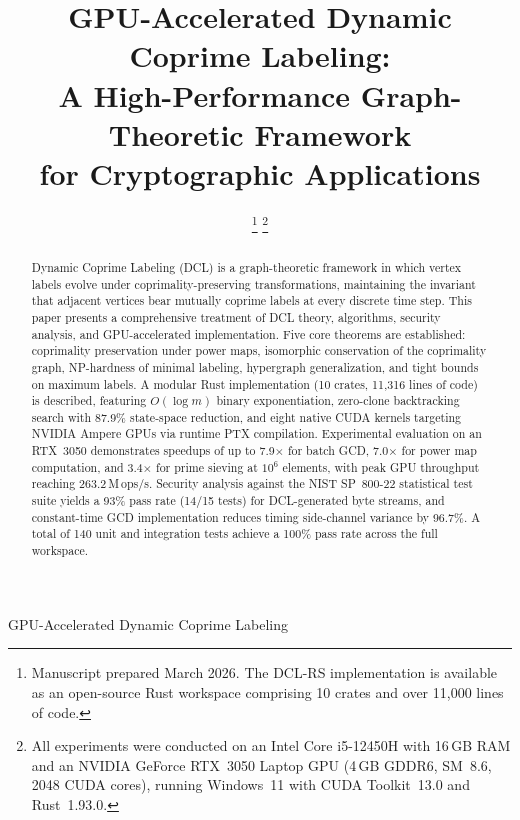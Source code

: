 \documentclass[lettersize,journal]{IEEEtran}
\begin{document}
\title{GPU-Accelerated Dynamic Coprime Labeling:\\A High-Performance Graph-Theoretic Framework\\for Cryptographic Applications}

\author{%
\thanks{Manuscript prepared March 2026. The DCL-RS implementation is available as an open-source Rust workspace comprising 10 crates and over 11{,}000 lines of code.}%
\thanks{All experiments were conducted on an Intel Core i5-12450H with 16\,GB RAM and an NVIDIA GeForce RTX~3050 Laptop GPU (4\,GB GDDR6, SM~8.6, 2048 CUDA cores), running Windows~11 with CUDA Toolkit~13.0 and Rust~1.93.0.}}

%
{GPU-Accelerated Dynamic Coprime Labeling}

\maketitle

\begin{abstract}
Dynamic Coprime Labeling (DCL) is a graph-theoretic framework in which vertex labels evolve under coprimality-preserving transformations, maintaining the invariant that adjacent vertices bear mutually coprime labels at every discrete time step. This paper presents a comprehensive treatment of DCL theory, algorithms, security analysis, and GPU-accelerated implementation. Five core theorems are established: coprimality preservation under power maps, isomorphic conservation of the coprimality graph, NP-hardness of minimal labeling, hypergraph generalization, and tight bounds on maximum labels. A modular Rust implementation (10 crates, 11{,}316 lines of code) is described, featuring $O(\log m)$ binary exponentiation, zero-clone backtracking search with 87.9\% state-space reduction, and eight native CUDA kernels targeting NVIDIA Ampere GPUs via runtime PTX compilation. Experimental evaluation on an RTX~3050 demonstrates speedups of up to 7.9$\times$ for batch GCD, 7.0$\times$ for power map computation, and 3.4$\times$ for prime sieving at $10^6$ elements, with peak GPU throughput reaching 263.2\,M\,ops/s. Security analysis against the NIST SP~800-22 statistical test suite yields a 93\% pass rate (14/15 tests) for DCL-generated byte streams, and constant-time GCD implementation reduces timing side-channel variance by 96.7\%. A total of 140 unit and integration tests achieve a 100\% pass rate across the full workspace.
\end{abstract}
\end{document}
